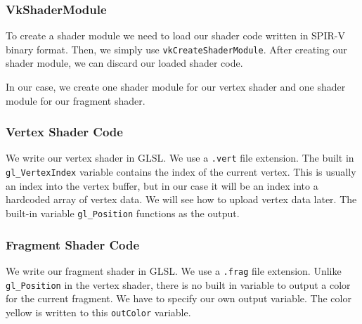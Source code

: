 \subsubsection{VkShaderModule}

To create a shader module we need to load our shader code written
in SPIR-V binary format.
Then, we simply use \texttt{vkCreateShaderModule}.
After creating our shader module, we can discard our loaded shader code.

\begin{minipage}{\linewidth}{\noindent}
    
\end{minipage}

In our case, we create one shader module for our vertex shader and one shader
module for our fragment shader.

\subsubsection{Vertex Shader Code}

We write our vertex shader in GLSL.
We use a \texttt{.vert} file extension.
The built in \texttt{gl\_VertexIndex} variable contains the index of the
current vertex.
This is usually an index into the vertex buffer, but in our case
it will be an index into a hardcoded array of vertex data.
We will see how to upload vertex data later.
The built-in variable \texttt{gl\_Position} functions as the output.

\begin{minipage}{\linewidth}{\noindent}
    
\end{minipage}

\subsubsection{Fragment Shader Code}

We write our fragment shader in GLSL.
We use a \texttt{.frag} file extension.
Unlike \texttt{gl\_Position} in the vertex shader, there is no built in
variable to output a color for the current fragment.
We have to specify our own output variable.
The color yellow is written to this \texttt{outColor} variable.

\begin{minipage}{\linewidth}{\noindent}
    
\end{minipage}

